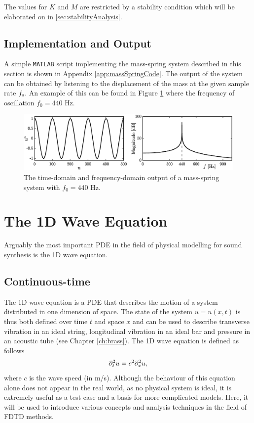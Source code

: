 The values for $K$ and $M$ are restricted by a stability condition which will be elaborated on in \ref{sec:stabilityAnalysis}.

\subsection{Implementation and Output}
A simple \texttt{MATLAB} script implementing the mass-spring system described in this section is shown in Appendix \ref{app:massSpringCode}. The output of the system can be obtained by listening to the displacement of the mass at the given sample rate $f_\text{s}$. An example of this can be found in Figure \ref{fig:massSpringOutput} where the frequency of oscillation $f_0 = 440$ Hz.

\begin{figure}[ht]
    \includegraphics[width=\textwidth]{figures/fdtd/massSpringOutput.eps}
    \caption{The time-domain and frequency-domain output of a mass-spring system with $f_0 = 440$ Hz. \label{fig:massSpringOutput}}
\end{figure}



\section{%
The 1D Wave Equation}
Arguably the most important PDE in the field of physical modelling for sound synthesis is the 1D wave equation.

\subsection{Continuous-time}
The 1D wave equation is a PDE that describes the motion of a system distributed in one dimension of space. The state of the system $u=u(x,t)$ is thus both defined over time $t$ and space $x$ and can be used to describe transverse vibration in an ideal string, longitudinal vibration in an ideal bar and pressure in an acoustic tube (see Chapter \ref{ch:brass}). The 1D wave equation is defined as follows
\begin{equation}\label{eq:1DwavePDE}
    \partial_t^2 u = c^2 \partial_x^2 u,
\end{equation}
where $c$ is the wave speed (in m/s). Although the behaviour of this equation alone does not appear in the real world, as no physical system is ideal, it is extremely useful as a test case and a basis for more complicated models. Here, it will be used to introduce various concepts and analysis techniques in the field of FDTD methods.

